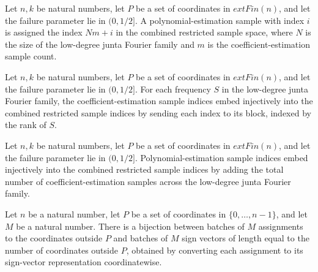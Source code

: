 \begin{definition}
\label{FABL.lowDegreeJuntaPolynomialSampleIndex}
\leanok
{}
Let $n,k$ be natural numbers, let $P$ be a set of coordinates in $	ext{Fin}(n)$, and let
the failure parameter lie in $(0,1/2]$. A polynomial-estimation sample with index $i$ is
assigned the index $N m+i$ in the combined restricted sample space, where $N$ is the
size of the low-degree junta Fourier family and $m$ is the coefficient-estimation sample
count.
\end{definition}

\begin{definition}
\label{FABL.lowDegreeJuntaCoefficientSampleEmbedding}
\leanok
{}
Let $n,k$ be natural numbers, let $P$ be a set of coordinates in $	ext{Fin}(n)$, and let
the failure parameter lie in $(0,1/2]$. For each frequency $S$ in the low-degree junta
Fourier family, the coefficient-estimation sample indices embed injectively into the
combined restricted sample indices by sending each index to its block, indexed by the
rank of $S$.
\end{definition}

\begin{definition}
\label{FABL.lowDegreeJuntaPolynomialSampleEmbedding}
\leanok
{}
Let $n,k$ be natural numbers, let $P$ be a set of coordinates in $	ext{Fin}(n)$, and let
the failure parameter lie in $(0,1/2]$. Polynomial-estimation sample indices embed
injectively into the combined restricted sample indices by adding the total number of
coefficient-estimation samples across the low-degree junta Fourier family.
\end{definition}

\begin{definition}
\label{FABL.juntaFreeInputBatchEquiv}
\leanok
{}
Let $n$ be a natural number, let $P$ be a set of coordinates in $\{0,\ldots,n-1\}$,
and let $M$ be a natural number. There is a bijection between batches of $M$ assignments
to the coordinates outside $P$ and batches of $M$ sign vectors of length equal to the
number of coordinates outside $P$, obtained by converting each assignment to its
sign-vector representation coordinatewise.
\end{definition}

